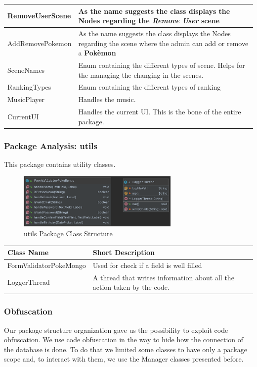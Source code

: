 \begin{center}
\begin{longtable}{| m{14em} | m{19em} |}
		\hline
		RemoveUserScene & As the name suggests the class displays the Nodes regarding the \textit{Remove User} scene\\
		\hline
		AddRemovePokemon & As the name suggests the class displays the Nodes regarding the scene where the admin can add or remove a \textbf{Pokèmon}\\
		\hline
		SceneNames & Enum containing the different types of scene. Helps for the managing the changing in the scenes.\\
		\hline
		RankingTypes & Enum containing the different types of ranking\\
		\hline
		MusicPlayer & Handles the music.\\
		\hline
		CurrentUI & Handles the current UI. This is the bone of the entire package.\\
		\hline
	\end{longtable}
\end{center}
\endgroup
\subsubsection{Package Analysis: utils}
This package contains utility classes. 
\begin{figure}[H]
	\centering
	\includegraphics[width=0.7\textwidth]{img/utils_package.png}
	\caption{utils Package Class Structure}
\end{figure}
\begingroup
\setlength{\tabcolsep}{10pt} %
\renewcommand{\arraystretch}{1.5} %
\begin{center}
	\begin{longtable}{| m{14em} | m{19em} |} 
		\hline
		\textbf{Class Name} & \textbf{Short Description} \\ [0.5ex] 
		\hline
		FormValidatorPokeMongo & Used for check if a field is well filled\\ 
		\hline
		LoggerThread & A thread that writes information about all the action taken by the code.\\ 
		\hline
	\end{longtable}
\end{center}
\endgroup

\subsubsection{Obfuscation}
Our package structure organization gave us the possibility to exploit code obfuscation. We use code obfuscation in the way to hide how the connection of the database is done. To do that we limited some classes to have only a package scope and, to interact with them, we use the Manager classes presented before.

